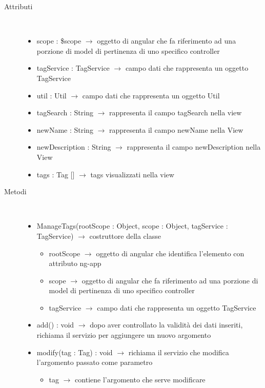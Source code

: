\begin{description}
\item[Attributi] \hfill \\
\vspace{-7mm}
\begin{itemize}
	\item scope : \$scope $\rightarrow$ oggetto di angular che fa riferimento ad una porzione di model di pertinenza di uno specifico controller
	\item tagService : TagService $\rightarrow$ campo dati che rappresenta un oggetto TagService
	\item util : Util $\rightarrow$ campo dati che rappresenta un oggetto Util
	\item tagSearch : String $\rightarrow$ rappresenta il campo tagSearch nella view
	\item newName : String $\rightarrow$ rappresenta il campo newName nella View
	\item newDescription : String $\rightarrow$ rappresenta il campo newDescription nella View
	\item tags : Tag [] $\rightarrow$ tags visualizzati nella view
\end{itemize}

\item[Metodi] \hfill \\
\vspace{-7mm}
\begin{itemize}
	\item ManageTags(rootScope : Object, scope : Object, tagService : TagService) $\rightarrow$ costruttore della classe\begin{itemize}
		\item rootScope $\rightarrow$ oggetto di angular che identifica l’elemento con attributo ng-app
		\item scope $\rightarrow$ oggetto di angular che fa riferimento ad una porzione di model di pertinenza di uno specifico controller
		\item tagService $\rightarrow$ campo dati che rappresenta un oggetto TagService 
	\end{itemize}
	
	\item add() : void $\rightarrow$ dopo aver controllato la validità dei dati inseriti, richiama il servizio per aggiungere un nuovo argomento
	\item modify(tag : Tag) : void $\rightarrow$ richiama il servizio che modifica l'argomento passato come parametro\begin{itemize}
		\item tag $\rightarrow$ contiene l'argomento che serve modificare 
	\end{itemize}
	

\end{itemize}
\end{description}
